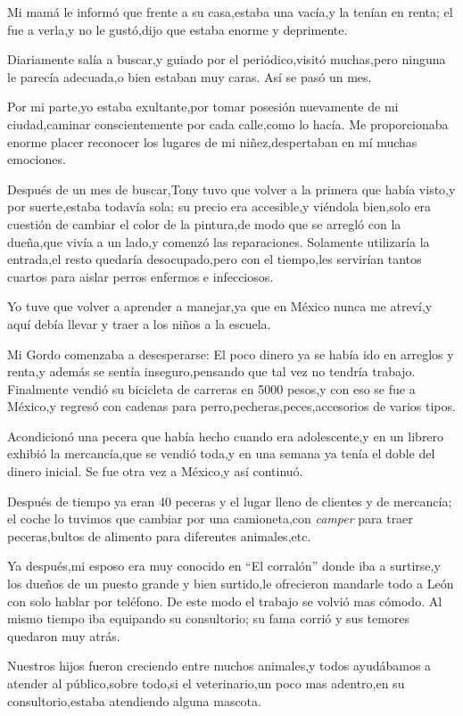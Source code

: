 \documentclass[letterpaper,12pt]{book}
\begin{document}
Mi mamá le informó que frente a su casa,estaba una vacía,y la tenían en renta; el fue a verla,y no le gustó,dijo que estaba enorme y deprimente.

Diariamente salía a buscar,y guiado por el periódico,visitó muchas,pero ninguna le parecía adecuada,o bien estaban muy caras. Así se pasó un mes.

Por mi parte,yo estaba exultante,por tomar posesión nuevamente de mi ciudad,caminar conscientemente por cada calle,como lo hacía. Me proporcionaba enorme placer reconocer los lugares de mi niñez,despertaban en mí muchas emociones. 

Después de un mes de buscar,Tony tuvo que volver a la primera que había visto,y por suerte,estaba todavía sola; su precio era accesible,y viéndola bien,solo era cuestión de cambiar el color de la pintura,de modo que se arregló con la dueña,que vivía a un lado,y comenzó las reparaciones. Solamente utilizaría la entrada,el resto quedaría desocupado,pero con el tiempo,les servirían tantos cuartos para aislar perros enfermos e infecciosos. 

Yo tuve que volver a aprender a manejar,ya que en México nunca me atreví,y aquí debía llevar y traer a los niños a la escuela.

Mi Gordo comenzaba a desesperarse: El poco dinero ya se había ido en arreglos y renta,y además se sentía inseguro,pensando que tal vez no tendría trabajo. Finalmente vendió su bicicleta de carreras en 5000 pesos,y con eso se fue a México,y regresó con cadenas para perro,pecheras,peces,accesorios de varios tipos.

Acondicionó una pecera que había hecho cuando era adolescente,y en un librero exhibió la mercancía,que se vendió toda,y en una semana ya tenía el doble del dinero inicial. Se fue otra vez a México,y así continuó. 

Después de tiempo ya eran 40 peceras y el lugar lleno de clientes y de mercancía; el coche lo tuvimos que cambiar por una camioneta,con \textit{camper} para traer peceras,bultos de alimento para diferentes animales,etc. 

Ya después,mi esposo era muy conocido en ``El corralón'' donde iba a surtirse,y los dueños de un puesto grande y bien surtido,le ofrecieron mandarle todo a León con solo hablar por teléfono. De este modo el trabajo se volvió mas cómodo. Al mismo tiempo iba equipando su consultorio; su fama corrió y sus temores quedaron muy atrás.

Nuestros hijos fueron creciendo entre muchos animales,y todos ayudábamos a atender al público,sobre todo,si el veterinario,un poco mas adentro,en su consultorio,estaba atendiendo alguna mascota.
\end{document}
